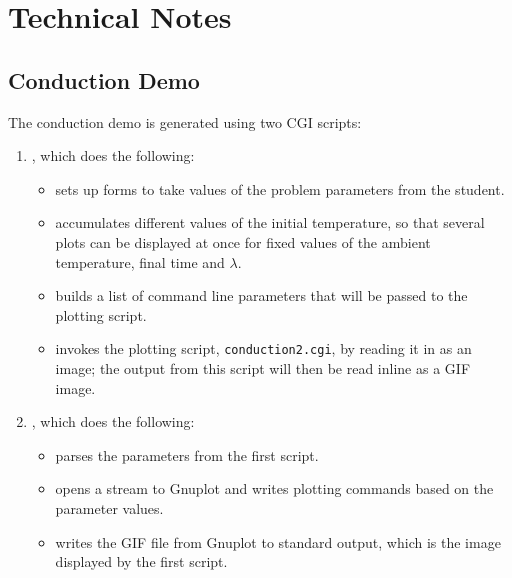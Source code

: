 % 
%
%
%
%
%

\section{Technical Notes}
\label{lab1:ap:technote}

\subsection{Conduction Demo}
\label{lab1:tech:conduction}

The conduction demo is generated using two CGI scripts:
\begin{enumerate}
\item {},
  which does the following:
  \begin{itemize}
  \item sets up forms to take values of the problem parameters from the
    student.  
  \item accumulates different values of the initial temperature, so that
    several plots can be displayed at once for fixed values of the
    ambient temperature, final time and $\lambda$.  
  \item builds a list of command line parameters that will be passed to
    the plotting script.
    \item invokes the plotting script, {\tt conduction2.cgi}, by
      reading it in as an image; the output from this script will then
      be read inline as a GIF image.
    \end{itemize}
\item {}, which does
  the following:
  \begin{itemize}
  \item parses the parameters from the first script.
  \item opens a stream to Gnuplot and writes plotting commands based
    on the parameter values.
  \item writes the GIF file from Gnuplot to standard output, which
    is the image displayed by the first script.
  \end{itemize}
\end{enumerate}

